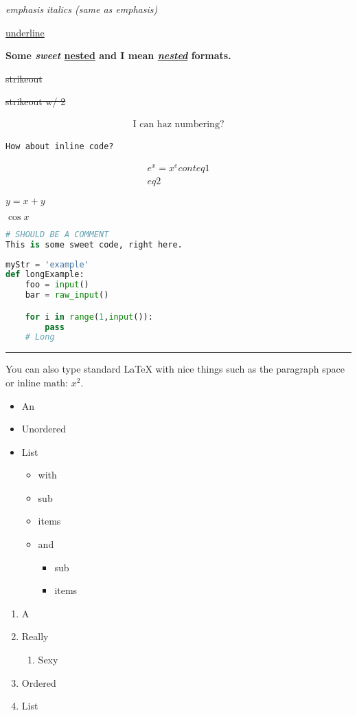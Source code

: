 \documentclass{article}
\begin{document}
\emph{emphasis}
\emph{italics (same as emphasis)}

\underline{underline}

\textbf{Some \emph{sweet} \underline{nested} and I mean \underline{\emph{nested}} formats.}

\sout{strikeout}

\sout{strikeout w/ 2}

\begin{gather}
\textrm{I can haz numbering?}
\end{gather}

\lstinline[columns=fixed]$How about inline code?$

\begin{gather*}
e^x = x^e cont eq 1\\
eq 2
\end{gather*}

$ y = x + y $

$ \cos x $

\begin{lstlisting}[language=python,]
# SHOULD BE A COMMENT
This is some sweet code, right here.
\end{lstlisting}

\begin{lstlisting}[language=python,caption=This is code with a caption.]
myStr = 'example'
def longExample:
    foo = input()
    bar = raw_input()

    for i in range(1,input()):
        pass
    # Long
\end{lstlisting}

\rule{\textwidth}{0.4pt}

You can also type standard \LaTeX{} with nice things
such as the paragraph space or $\textrm{inline math: }x^2$.

\begin{itemize}
\item An
\item Unordered
\item List
\begin{itemize}
\item with
\item sub
\item items
\item and
\begin{itemize}
\item sub
\item items
\end{itemize}
\end{itemize}
\end{itemize}
\begin{enumerate}
\item A
\item Really
\begin{enumerate}
\item Sexy
\end{enumerate}
\item Ordered
\item List
\end{enumerate}
\end{document}
